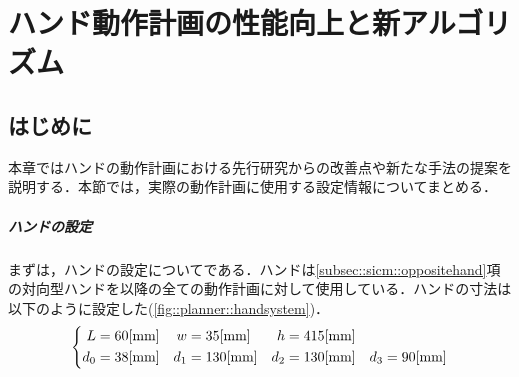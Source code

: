 \documentclass[a4paper,twoside,12pt,papersize, dvipdfmx]{iirthesis}
\begin{document}
    \newcommand{\figref}[1]{\figurename\ref{#1}}
    \newcommand{\tabref}[1]{\tablename\ref{#1}}
    \renewcommand{\eqref}[1]{式~(\ref{#1})}
    \newcommand{\chapref}[1]{\ref{#1}章}
    \newcommand{\secref}[1]{\ref{#1}節}
    \newcommand{\ssecref}[1]{\ref{#1}項}
    \newcommand{\appref}[1]{付録\ref{#1}}
    \newcommand{\algoref}[1]{Algorithm.\ref{#1}}
\fi

\newcommand{\tab}[0]{\;\;\;\;}

\chapter{ハンド動作計画の性能向上と新アルゴリズム}\label{chap::planner}
\minitoc

\section{はじめに}\label{sec::planner::intro}
本章ではハンドの動作計画における先行研究からの改善点や新たな手法の提案を説明する．本節では，実際の動作計画に使用する設定情報についてまとめる．\par

\paragraph{ハンドの設定}
まずは，ハンドの設定についてである．ハンドは\ssecref{subsec::sicm::oppositehand}の対向型ハンドを以降の全ての動作計画に対して使用している．ハンドの寸法は以下のように設定した(\figref{fig::planner::handsystem})．
\begin{gather}
\notag
\left\{
\begin{aligned}
L &= 60 \mathrm{[mm]} & w& = 35 \mathrm{[mm]} & h &= 415 \mathrm{[mm]}\\
d_0 &= 38 \mathrm{[mm]} & d_1 &= 130 \mathrm{[mm]} & d_2 &= 130 \mathrm{[mm]} & d_3 = 90 \mathrm{[mm]}
\end{aligned}
\right .
\end{gather}
\end{document}
